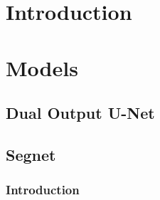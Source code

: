 \section{Introduction}
\vspace{0.2in}
\hspace*{0.16in}
\lipsum[3-3]

\section{Models}
\vspace{0.2in}
\hspace*{0.16in}
\lipsum[3-3]

\subsection{Dual Output U-Net}
\lipsum[3-6]

\subsection{Segnet}
\lipsum[3-6]
\subsubsection{Introduction}
\lipsum[2-2]
